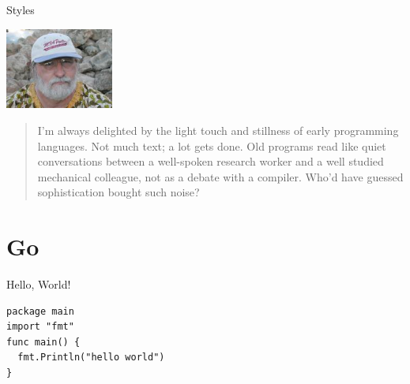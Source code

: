 \begin{frame}{Styles}
  \begin{center}
    \includegraphics[width=1.4in]{img/richard-gabriel.jpg}
  \end{center}
  \begin{quote}
    I'm always delighted by the light touch and stillness of early programming languages.
    Not much text; a lot gets done.
    Old programs read like quiet conversations between a well-spoken research worker and a well studied mechanical colleague, not as a debate with a compiler.
    Who'd have guessed sophistication bought such noise? \\
    \hspace*{}
  \end{quote}

\end{frame}

\section{Go}
\begin{frame}[fragile]{Hello, World!}
  \begin{verbatim}
package main
import "fmt"
func main() {
  fmt.Println("hello world")
}
  \end{verbatim}
\end{frame}
